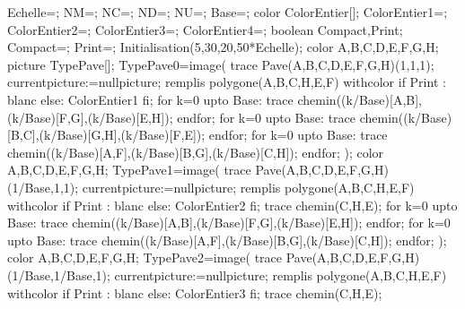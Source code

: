 {{{    }{%
    }%
    \begin{Geometrie}[TypeTrace="Espace",CoinBG={u*(-10,-10)},CoinHD={u*(20,20)}]
      Echelle=;
      NM=\NombreMilliers;
      NC=\NombreCentaines;
      ND=\NombreDizaines;
      NU=\NombreUnites;
      Base=;
      color ColorEntier[];
      ColorEntier1=\ListeCouleurEntier[1];
      ColorEntier2=\ListeCouleurEntier[2];
      ColorEntier3=\ListeCouleurEntier[3];
      ColorEntier4=\ListeCouleurEntier[4];
      boolean Compact,Print;
      Compact=;
      Print=;
      Initialisation(5,30,20,50*Echelle);
      color A,B,C,D,E,F,G,H;
      picture TypePave[];
      TypePave0=image(
      trace Pave(A,B,C,D,E,F,G,H)(1,1,1);
      currentpicture:=nullpicture;
      remplis polygone(A,B,C,H,E,F) withcolor if Print : blanc else: ColorEntier1 fi;
      for k=0 upto Base:
      trace chemin((k/Base)[A,B],(k/Base)[F,G],(k/Base)[E,H]);
      endfor;
      for k=0 upto Base:
      trace chemin((k/Base)[B,C],(k/Base)[G,H],(k/Base)[F,E]);
      endfor;
      for k=0 upto Base:
      trace chemin((k/Base)[A,F],(k/Base)[B,G],(k/Base)[C,H]);
      endfor;
      );
      color A,B,C,D,E,F,G,H;
      TypePave1=image(
      trace Pave(A,B,C,D,E,F,G,H)(1/Base,1,1);
      currentpicture:=nullpicture;
      remplis polygone(A,B,C,H,E,F) withcolor if Print : blanc else: ColorEntier2 fi;
      trace chemin(C,H,E);
      for k=0 upto Base:
      trace chemin((k/Base)[A,B],(k/Base)[F,G],(k/Base)[E,H]);
      endfor;
      for k=0 upto Base:
      trace chemin((k/Base)[A,F],(k/Base)[B,G],(k/Base)[C,H]);
      endfor;
      );
      color A,B,C,D,E,F,G,H;
      TypePave2=image(
      trace Pave(A,B,C,D,E,F,G,H)(1/Base,1/Base,1);
      currentpicture:=nullpicture;
      remplis polygone(A,B,C,H,E,F) withcolor if Print : blanc else: ColorEntier3 fi;
      trace chemin(C,H,E);

\end{Geometrie}}}
